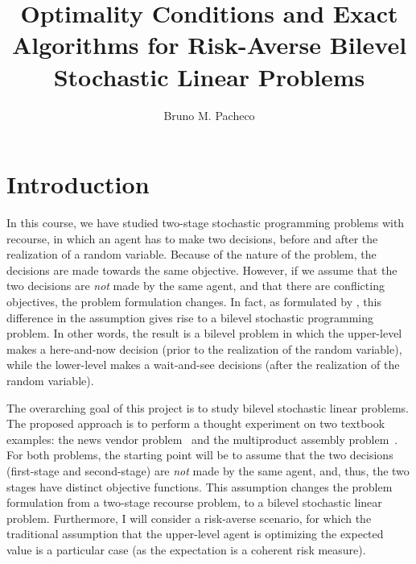 \documentclass[twoside,11pt]{article}
\begin{document}
\title{Optimality Conditions and Exact Algorithms for Risk-Averse Bilevel Stochastic Linear Problems}

\author{Bruno M. Pacheco}

\maketitle

\section*{Introduction}

In this course, we have studied two-stage stochastic programming problems with recourse, in which an agent has to make two decisions, before and after the realization of a random variable.
Because of the nature of the problem, the decisions are made towards the same objective.
However, if we assume that the two decisions are \emph{not} made by the same agent, and that there are conflicting objectives, the problem formulation changes.
In fact, as formulated by \citet{burtscheidtBilevelLinearOptimization2020}, this difference in the assumption gives rise to a bilevel stochastic programming problem.
In other words, the result is a bilevel problem in which the upper-level makes a here-and-now decision (prior to the realization of the random variable), while the lower-level makes a wait-and-see decisions (after the realization of the random variable).

The overarching goal of this project is to study bilevel stochastic linear problems.
The proposed approach is to perform a thought experiment on two textbook examples: the news vendor problem~\citep{birgeIntroductionStochasticProgramming2011,shapiroLecturesStochasticProgramming2009} and the multiproduct assembly problem~\citep{shapiroLecturesStochasticProgramming2009}.
For both problems, the starting point will be to assume that the two decisions (first-stage and second-stage) are \emph{not} made by the same agent, and, thus, the two stages have distinct objective functions.
This assumption changes the problem formulation from a two-stage recourse problem, to a bilevel stochastic linear problem. 
Furthermore, I will consider a risk-averse scenario, for which the traditional assumption that the upper-level agent is optimizing the expected value is a particular case (as the expectation is a coherent risk measure).
\end{document}
